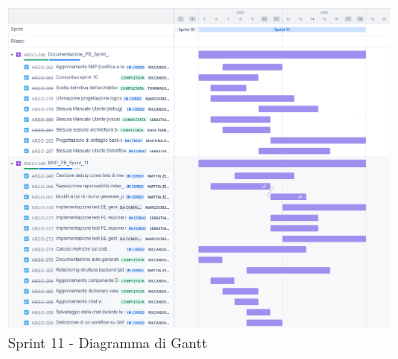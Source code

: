 \begin{figure}[H]
  \centering
  \includegraphics[width=0.90\textwidth]{assets/Pianificazione/Sprint-11/gantt.png}
  \caption{Sprint 11 - Diagramma di Gantt}\label{fig:sprint-10-gantt}
\end{figure}

